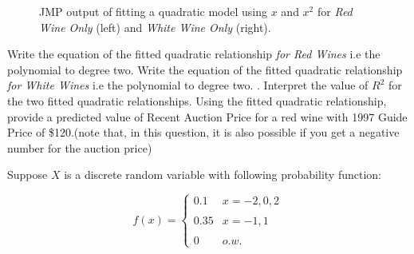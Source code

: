 \documentclass[addpoints]{examsetup}
\begin{document}
\begin{questions}
\begin{parts}
\begin{figure}
\begin{minipage}[b]{.5\linewidth}
  \end{minipage}
  \caption{JMP output of fitting a quadratic model using $x$ and $x^2$ for \textit{Red Wine Only} (left) and \textit{White Wine Only} (right). }
\end{figure}




   \begin{subparts}
      \subpart[5] Write the equation of the fitted quadratic relationship \textit{for Red Wines} i.e the polynomial to degree two. 
      \vspace{2cm}
      \subpart[5] Write the equation of the fitted quadratic relationship \textit{for White Wines}  i.e the polynomial to degree two. . 
      \vspace{2cm}
      \subpart[5] Interpret the value of $R^2$ for the two fitted quadratic relationships.
      \vspace{2cm}
      \subpart[5] Using the fitted quadratic relationship, provide a predicted value of Recent Auction Price for a red wine with 1997 Guide Price of \$120.(note that, in this question, it is also possible if you get a negative number for the auction price)
      \vspace[4cm]
   \end{subparts}
\end{parts}
\pagebreak
\question
      Suppose $X$ is a discrete random variable with following probability function:

      $$f(x) = \begin{cases} 0.1 & x = -2, 0, 2 \\\\ 0.35 & x = -1, 1 \\\\ 0 & o.w. \end{cases}$$
      

\end{questions}
\end{document}

